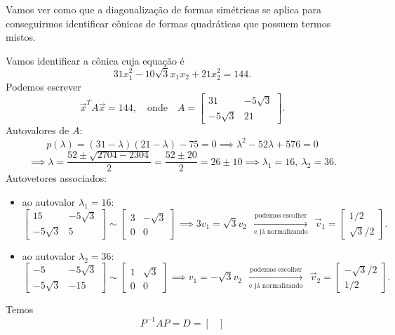 \documentclass[../livro.tex]{subfiles}
\begin{document}
\noindent Vamos ver como que a diagonalização de formas simétricas se aplica para conseguirmos identificar cônicas de formas quadráticas que possuem termos mistos.


\begin{example}
	Vamos identificar a cônica cuja equação é
	\[
	31 x_1^2 - 10\sqrt{3} x_1x_2 + 21 x_2^2 = 144.
	\] Podemos escrever
	\[
	\vec{x}^T A \vec{x} = 144, \quad \text{onde} \quad
	A = 
	\begin{bmatrix}
	31 & -5\sqrt{3} \\
	-5\sqrt{3} &  21
	\end{bmatrix}.
	\] Autovalores de $A$:
	\[
	p(\lambda) = (31 - \lambda)(21-\lambda) - 75 = 0 \implies \lambda^2 - 52 \lambda + 576
	= 0
	\]
	\[
	\implies \lambda = \frac{52 \pm \sqrt{2704 - 2304}}{2} = \frac{52 \pm 20}{2} = 26\pm 10 \implies \lambda_1 = 16, \ \lambda_2 = 36.
	\] Autovetores associados:
	\begin{itemize}
		\item  ao autovalor $\lambda_1 = 16$:
		\[
		\begin{bmatrix}
		15 & -5\sqrt{3} \\
		-5\sqrt{3} &  5
		\end{bmatrix} \sim
		\begin{bmatrix}
		3 & -\sqrt{3} \\
		0 &  0
		\end{bmatrix} \implies 
		3v_1 = \sqrt{3} v_2 \ \ \xrightarrow[\text{e já normalizando}]{\text{podemos escolher}} \ \  \vec{v}_1 = 
		\begin{bmatrix}
		1/2 \\ \sqrt{3}/2
		\end{bmatrix}.
		\]
		\item ao autovalor $\lambda_2 = 36$:
		\[
		\begin{bmatrix}
		-5 & -5\sqrt{3} \\
		-5\sqrt{3} &  -15
		\end{bmatrix} \sim
		\begin{bmatrix}
		1 & \sqrt{3} \\
		0 &  0
		\end{bmatrix} \implies 
		v_1 = - \sqrt{3} v_2 \ \ \xrightarrow[\text{e já normalizando}]{\text{podemos escolher}} \ \  \vec{v}_2 = 
		\begin{bmatrix}
		-\sqrt{3}/2 \\ 1/2
		\end{bmatrix}.
		\]
	\end{itemize} Temos
	\[
	P^{-1} A P = D =
	\begin{bmatrix}

\end{bmatrix}\]
\end{example}
\end{document}

